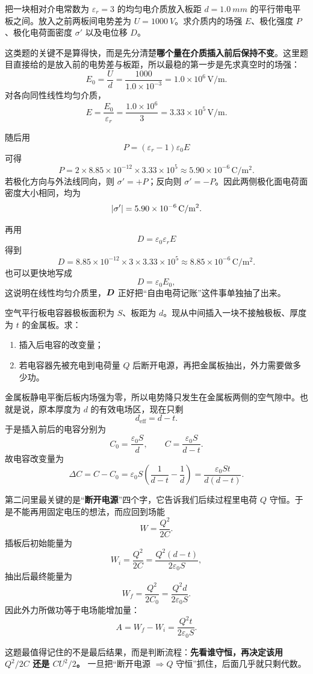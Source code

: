 \documentclass[lang=cn,11pt]{elegantbook}
\begin{document}
\begin{example}
把一块相对介电常数为 \(\varepsilon_r=3\) 的均匀电介质放入板距 \(d=\SI{1.0}{mm}\) 的平行带电平板之间。放入之前两板间电势差为 \(U=\SI{1000}{V}\)。求介质内的场强 \(E\)、极化强度 \(P\)、极化电荷面密度 \(\sigma'\) 以及电位移 \(D\)。
\end{example}

\begin{solution}
这类题的关键不是算得快，而是先分清楚\textbf{哪个量在介质插入前后保持不变}。这里题目直接给的是放入前的电势差与板距，所以最稳的第一步是先求真空时的场强：
\[
E_0=\frac{U}{d}
=\frac{1000}{1.0\times 10^{-3}}
=1.0\times 10^6\,\mathrm{V/m}.
\]
对各向同性线性均匀介质，
\[
E=\frac{E_0}{\varepsilon_r}
=\frac{1.0\times 10^6}{3}
=3.33\times 10^5\,\mathrm{V/m}.
\]

随后用
\[
P=(\varepsilon_r-1)\varepsilon_0E
\]
可得
\[
P=2\times 8.85\times 10^{-12}\times 3.33\times 10^5
\approx 5.90\times 10^{-6}\,\mathrm{C/m^2}.
\]
若极化方向与外法线同向，则 \(\sigma'=+P\)；反向则 \(\sigma'=-P\)。因此两侧极化面电荷面密度大小相同，均为
\[
\abs{\sigma'}=5.90\times 10^{-6}\,\mathrm{C/m^2}.
\]

再用
\[
D=\varepsilon_0\varepsilon_rE
\]
得到
\[
D=8.85\times 10^{-12}\times 3\times 3.33\times 10^5
\approx 8.85\times 10^{-6}\,\mathrm{C/m^2}.
\]
也可以更快地写成
\[
D=\varepsilon_0E_0,
\]
这说明在线性均匀介质里，\(\vb*{D}\) 正好把“自由电荷记账”这件事单独抽了出来。
\end{solution}

\begin{example}[插入金属板后电容与做功怎样变化]
空气平行板电容器极板面积为 \(S\)、板距为 \(d\)。现从中间插入一块不接触极板、厚度为 \(t\) 的金属板。求：
\begin{enumerate}
  \item 插入后电容的改变量；
  \item 若电容器先被充电到电荷量 \(Q\) 后断开电源，再把金属板抽出，外力需要做多少功。
\end{enumerate}
\end{example}

\begin{solution}
金属板静电平衡后板内场强为零，所以电势降只发生在金属板两侧的空气隙中。也就是说，原本厚度为 \(d\) 的有效电场区，现在只剩
\[
d_{\mathrm{eff}}=d-t.
\]
于是插入前后的电容分别为
\[
C_0=\frac{\varepsilon_0S}{d},
\qquad
C=\frac{\varepsilon_0S}{d-t}.
\]
故电容改变量为
\[
\Delta C=C-C_0
=\varepsilon_0S\left(\frac{1}{d-t}-\frac{1}{d}\right)
=\frac{\varepsilon_0St}{d(d-t)}.
\]

第二问里最关键的是“\textbf{断开电源}”四个字，它告诉我们后续过程里电荷 \(Q\) 守恒。于是不能再用固定电压的想法，而应回到场能
\[
W=\frac{Q^2}{2C}.
\]
插板后初始能量为
\[
W_i=\frac{Q^2}{2C}
=\frac{Q^2(d-t)}{2\varepsilon_0S},
\]
抽出后最终能量为
\[
W_f=\frac{Q^2}{2C_0}
=\frac{Q^2d}{2\varepsilon_0S}.
\]
因此外力所做功等于电场能增加量：
\[
A=W_f-W_i
=\frac{Q^2t}{2\varepsilon_0S}.
\]

这题最值得记住的不是最后结果，而是判断流程：\textbf{先看谁守恒，再决定该用 \(Q^2/2C\) 还是 \(CU^2/2\)。} 一旦把“断开电源 \(\Rightarrow Q\) 守恒”抓住，后面几乎就只剩代数。
\end{solution}
\end{document}
